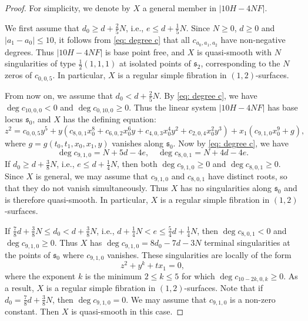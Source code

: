 \documentclass[a4paper,11pt]{amsart}
\newcommand{\s}{\ensuremath{\mathfrak{s}}}
\theoremstyle{definition}
\theoremstyle{remark}
\numberwithin{equation}{section}
\begin{document}
\begin{proof}
	For simplicity, we denote by $X$ a general member in $|10H - 4NF|$.
	
	We first assume that $d_0 \ge d + \frac25N$, i.e., $e \le d + \frac15 N$. Since $N \ge 0$, $d \ge 0$ and $|a_1-a_0| \le 10$, it follows from \eqref{eq: degree c} that all $c_{a_0,a_1,a_2}$ have non-negative degrees. Thus $|10H - 4NF|$ is base point free, and $X$ is quasi-smooth with $N$ singularities of type $\frac12(1,1,1)$ at isolated points of $\s_2$, corresponding to the $N$ zeros of $c_{0,0,5}$. In particular, $X$ is a regular simple fibration in $(1, 2)$-surfaces.
	
	From now on, we assume that $d_0 < d + \tfrac25N$. By \eqref{eq: degree c}, we have $\deg c_{10,0,0} < 0$ and $\deg c_{0,10,0} \ge 0$. Thus the linear system $|10H - 4NF|$ has base locus $\s_0$, and $X$ has the defining equation:
	$$
	z^2 = c_{0,0,5}y^5 + y(c_{8,0,1}x_0^8 + c_{6,0,2}x_0^6y + c_{4,0,3}x_0^4y^2+c_{2,0,4}x_0^2y^3) + x_1 (c_{9,1,0}x_0^9 + g),
	$$
	where $g = g(t_0, t_1, x_0, x_1, y)$ vanishes along $\s_0$. Now by \eqref{eq: degree c}, we have
	$$
	\deg c_{9,1,0} = N + 5d - 4e, \quad \deg c_{8,0,1} = N + 4d - 4e.
	$$
	If $d_0 \ge d + \frac38 N$, i.e., $e \le d + \frac14 N$, then both $\deg c_{9,1,0} \ge 0$ and $\deg c_{8,0,1} \ge 0$. Since $X$ is general, we may assume that $c_{9,1,0}$ and $c_{8,0,1}$ have distinct roots, so that they do not vanish simultaneously. Thus $X$ has no singularities along $\s_0$ and is therefore quasi-smooth. In particular, $X$ is a regular simple fibration in $(1, 2)$-surfaces.
	
	If $\frac78d + \frac38 N \le d_0 < d + \frac38N$, i.e., $d + \frac14 N < e \le \frac{5}{4}d + \frac14 N$, then $\deg c_{8,0,1} < 0$ and $\deg c_{9,1,0} \ge 0$. Thus $X$ has $\deg c_{9,1,0}=8d_0-7d-3N$ terminal singularities at the points of $\s_0$ where $c_{9,1,0}$ vanishes. These singularities are locally of the form
	\[z^2+y^k+tx_1=0,\]
	where the exponent $k$ is the minimum $2\le k\le 5$ for which $\deg c_{10-2k,0,k} \ge 0$. As a result, $X$ is a regular simple fibration in $(1, 2)$-surfaces. Note that if $d_0 = \tfrac78d + \tfrac38N$, then $\deg c_{9,1,0} = 0$. We may assume that $c_{9,1,0}$ is a non-zero constant. Then $X$ is quasi-smooth in this case.
	

\end{proof}
\end{document}
